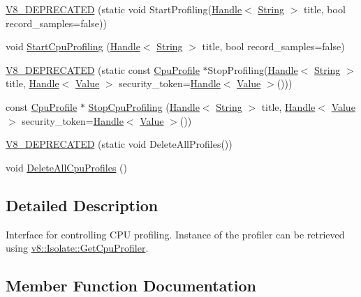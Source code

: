 \begin{DoxyCompactItemize}
\item 
\hyperlink{classv8_1_1_cpu_profiler_ae42634ecdc9bf7b36be4a1c7ba4d182a}{V8\+\_\+\+D\+E\+P\+R\+E\+C\+A\+T\+E\+D} (static void Start\+Profiling(\hyperlink{classv8_1_1_handle}{Handle}$<$ \hyperlink{classv8_1_1_string}{String} $>$ title, bool record\+\_\+samples=false))
\item 
void \hyperlink{classv8_1_1_cpu_profiler_a61b2b49010708f0283c1613e2bdc1adc}{Start\+Cpu\+Profiling} (\hyperlink{classv8_1_1_handle}{Handle}$<$ \hyperlink{classv8_1_1_string}{String} $>$ title, bool record\+\_\+samples=false)
\item 
\hyperlink{classv8_1_1_cpu_profiler_ad568a967e5ef304b81d05ba3b32162e6}{V8\+\_\+\+D\+E\+P\+R\+E\+C\+A\+T\+E\+D} (static const \hyperlink{classv8_1_1_cpu_profile}{Cpu\+Profile} $\ast$Stop\+Profiling(\hyperlink{classv8_1_1_handle}{Handle}$<$ \hyperlink{classv8_1_1_string}{String} $>$ title, \hyperlink{classv8_1_1_handle}{Handle}$<$ \hyperlink{classv8_1_1_value}{Value} $>$ security\+\_\+token=\hyperlink{classv8_1_1_handle}{Handle}$<$ \hyperlink{classv8_1_1_value}{Value} $>$()))
\item 
const \hyperlink{classv8_1_1_cpu_profile}{Cpu\+Profile} $\ast$ \hyperlink{classv8_1_1_cpu_profiler_a354412706bb739c295134349f34ed132}{Stop\+Cpu\+Profiling} (\hyperlink{classv8_1_1_handle}{Handle}$<$ \hyperlink{classv8_1_1_string}{String} $>$ title, \hyperlink{classv8_1_1_handle}{Handle}$<$ \hyperlink{classv8_1_1_value}{Value} $>$ security\+\_\+token=\hyperlink{classv8_1_1_handle}{Handle}$<$ \hyperlink{classv8_1_1_value}{Value} $>$())
\item 
\hyperlink{classv8_1_1_cpu_profiler_afa2d595434f4a7d840aac528f25fa764}{V8\+\_\+\+D\+E\+P\+R\+E\+C\+A\+T\+E\+D} (static void Delete\+All\+Profiles())
\item 
void \hyperlink{classv8_1_1_cpu_profiler_a73bc2fff59e78276025772a8380dc2ab}{Delete\+All\+Cpu\+Profiles} ()
\end{DoxyCompactItemize}


\subsection{Detailed Description}
Interface for controlling C\+P\+U profiling. Instance of the profiler can be retrieved using \hyperlink{classv8_1_1_isolate_a7eb415d9210d912aa57877ab6416fec8}{v8\+::\+Isolate\+::\+Get\+Cpu\+Profiler}. 

\subsection{Member Function Documentation}
\hypertarget{classv8_1_1_cpu_profiler_a73bc2fff59e78276025772a8380dc2ab}{}
